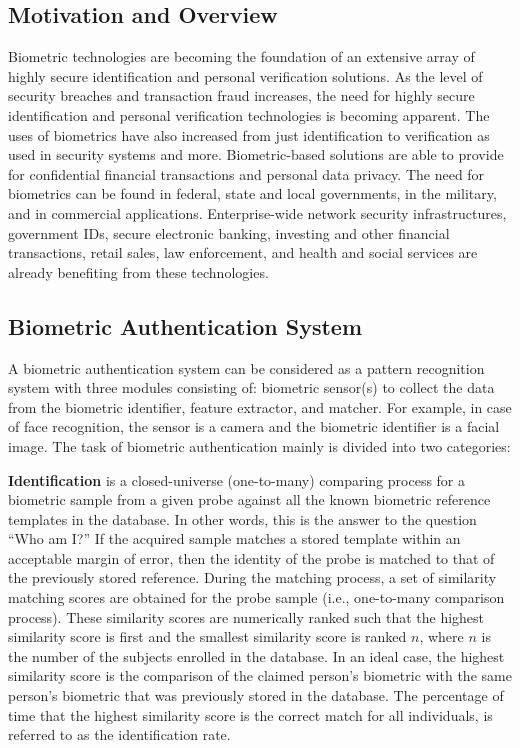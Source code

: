 \subsection{Motivation and Overview} Biometric technologies are
becoming the foundation of an extensive array of highly secure
identification and personal verification solutions. As the level of
security breaches and transaction fraud increases, the need for
highly secure identification and personal verification technologies
is becoming apparent. The uses of biometrics have also increased
from just identification to verification as used in security systems
and more. Biometric-based solutions are able to provide for
confidential financial transactions and personal data privacy. The
need for biometrics can be found in federal, state and local
governments, in the military, and in commercial applications.
Enterprise-wide network security infrastructures, government IDs,
secure electronic banking, investing and other financial
transactions, retail sales, law enforcement, and health and social
services are already benefiting from these technologies.

\subsection{Biometric Authentication System} A biometric
authentication system can be considered as a pattern recognition
system with three modules consisting of: biometric sensor(s) to
collect the data from the biometric identifier, feature extractor,
and matcher. For example, in case of face recognition, the sensor is
a camera and the biometric identifier is a facial image. The task of
biometric authentication mainly is divided into two categories:

\bi
\item\textbf{Identification} is a closed-universe (one-to-many) comparing process
for a biometric sample from a given probe against all the known
biometric reference templates in the database. In other words, this
is the answer to the question ``Who am I?'' If the acquired sample
matches a stored template within an acceptable margin of error, then
the identity of the probe is matched to that of the previously
stored reference. During the matching process, a set of similarity
matching scores are obtained for the probe sample (i.e., one-to-many
comparison process). These similarity scores are numerically ranked
such that the highest similarity score is first and the smallest
similarity score is ranked $n$, where $n$ is the number of the
subjects enrolled in the database. In an ideal case, the highest
similarity score is the comparison of the claimed person's biometric
with the same person's biometric that was previously stored in the
database. The percentage of time that the highest similarity score
is the correct match for all individuals, is referred to as the
identification rate.

